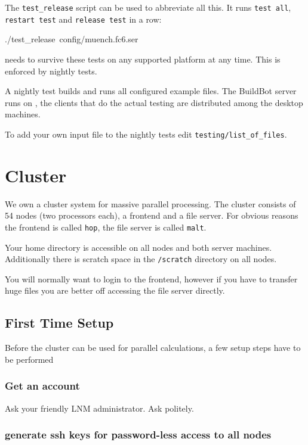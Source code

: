 The \texttt{test\_release} script can be used to abbreviate all this.
It runs \texttt{test all}, \texttt{restart test} and \texttt{release
test} in a row:

\begin{lyxcode}
./test\_release~config/muench.fc6.ser
\end{lyxcode}
\ccarat{} needs to survive these tests on any supported platform
at any time. This is enforced by nightly tests.

A nightly test builds and runs all configured example files. The BuildBot
server runs on \gauss{}, the clients that do the actual testing are
distributed among the desktop machines.

To add your own input file to the nightly tests edit \texttt{testing/list\_of\_files}.


\section{Cluster}

We own a cluster system for massive parallel processing. The cluster
consists of 54 nodes (two processors each), a frontend and a file
server. For obvious reasons the frontend is called \texttt{hop}, the
file server is called \texttt{malt}.

Your home directory is accessible on all nodes and both server machines.
Additionally there is scratch space in the \texttt{/scratch} directory
on all nodes.

You will normally want to login to the frontend, however if you have
to transfer huge files you are better off accessing the file server
directly.


\subsection{First Time Setup }

Before the cluster can be used for parallel calculations, a few setup
steps have to be performed


\subsubsection{Get an account}

Ask your friendly LNM administrator. Ask politely.


\subsubsection{generate ssh keys for password-less access to all nodes}

